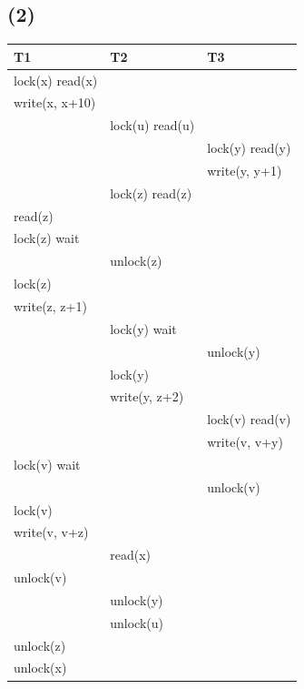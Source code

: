 \documentclass[12pt]{article}%
\begin{document}
\subsection*{(2)}
\begin{table}[h]
    \centering
    \begin{tabular}{lll}
        \hline
        T1              & T2              & T3              \\ \hline
        lock(x) read(x) &                 &                 \\
        write(x, x+10)  &                 &                 \\
                        & lock(u) read(u) &                 \\
                        &                 & lock(y) read(y) \\
                        &                 & write(y, y+1)   \\
                        & lock(z) read(z) &                 \\
        read(z)         &                 &                 \\
        lock(z) wait    &                 &                 \\
                        & unlock(z)       &                 \\
        lock(z)         &                 &                 \\
        write(z, z+1)   &                 &                 \\
                        & lock(y) wait    &                 \\
                        &                 & unlock(y)       \\
                        & lock(y)         &                 \\
                        & write(y, z+2)   &                 \\
                        &                 & lock(v) read(v) \\
                        &                 & write(v, v+y)   \\
        lock(v) wait    &                 &                 \\
                        &                 & unlock(v)       \\
        lock(v)         &                 &                 \\
        write(v, v+z)   &                 &                 \\
                        & read(x)         &                 \\
        unlock(v)       &                 &                 \\
                        & unlock(y)       &                 \\
                        & unlock(u)       &                 \\
        unlock(z)       &                 &                 \\
        unlock(x)       &                 &                 \\ \hline
        \end{tabular}
        \end{table}
    
\end{document}
